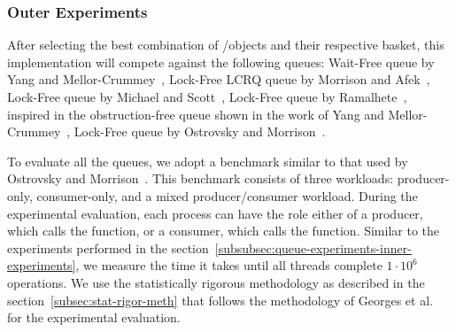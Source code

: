 \subsubsection{\label{subsubsec:queue-experiments-outer-experiments}Outer Experiments}

After selecting the best combination of \LL/\IC objects and their respective basket, this implementation will compete against the following queues:  Wait-Free queue by Yang and Mellor-Crummey~\cite{DBLP_conf_ppopp_YangM16},  Lock-Free LCRQ queue by Morrison and Afek~\cite{ppopp2013x86queues}, Lock-Free queue by Michael and Scott~\cite{DBLP_conf_podc_MichaelS96}, Lock-Free queue by Ramalhete~\cite{Ramalhete_Correia_MPMC_2016}, inspired in the obstruction-free queue shown in the work of Yang and Mellor-Crummey~\cite{DBLP_conf_ppopp_YangM16}, Lock-Free queue by Ostrovsky and Morrison~\cite{scalingconcurrent2020}.

To evaluate all the queues, we adopt a benchmark similar to that used by Ostrovsky and Morrison~\cite{scalingconcurrent2020}. This benchmark consists of three workloads: producer-only, consumer-only, and a mixed producer/consumer workload. During the experimental evaluation, each process can have the role either of a producer, which calls the \Enq function, or a consumer, which calls the \Deq function. Similar to the experiments performed in the section~\ref{subsubsec:queue-experiments-inner-experiments}, we measure the time it takes until all threads complete \(1\cdot 10^6\) operations. We use the statistically rigorous methodology as described in the section~\ref{subsec:stat-rigor-meth} that follows the methodology of Georges et al.~\cite{DBLP_conf_oopsla_GeorgesBE07} for the experimental evaluation.

